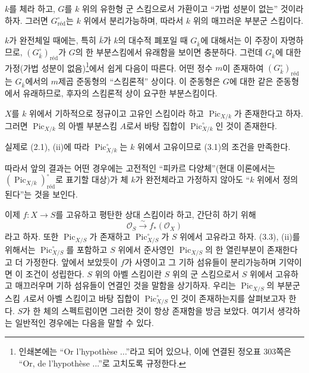 
 $k$를 체라 하고, $G$를 $k$ 위의 유한형 군 스킴으로서
가환이고 ``가법 성분이 없는'' 것이라 하자. 그러면
$G_{\mathrm{réd}}^\circ$는 $k$ 위에서 분리가능하며, 따라서 $k$ 위의
매끄러운 부분군 스킴이다.

$k$가 완전체일 때에는, 특히 $\bar k$가 $k$의 대수적 폐포일 때
$G_{\bar k}$에 대해서는 이 주장이 자명하므로,
$(G_{\bar k}^\circ)_{\mathrm{réd}}$가 $G$의 한 부분스킴에서 유래함을 보이면
충분하다. 그런데 $G_{\bar k}$에 대한 가정(가법 성분이 없음)\footnote{인쇄본에는
``Or l'hypothèse ...''라고 되어 있으나, 이에 연결된 정오표 303쪽은
``Or, de l'hypothèse ...''로 고치도록 규정한다.}에서 쉽게 다음이 따른다.
어떤 정수 $m$이 존재하여 $(G_{\bar k}^\circ)_{\mathrm{réd}}$는
$G_{\bar k}$에서의 $m$제곱 준동형의 ``스킴론적'' 상이다. 이 준동형은
$G$에 대한 같은 준동형에서 유래하므로, 후자의 스킴론적 상이 요구한
부분스킴이다.

 $X$를 $k$ 위에서 기하적으로 정규이고 고유인 스킴이라 하고
$\operatorname{Pic}_{X/k}$가 존재한다고 하자. 그러면
$\operatorname{Pic}_{X/k}$의 아벨 부분스킴 $A$로서 바탕 집합이
$\operatorname{Pic}_{X/k}^\circ$인 것이 존재한다.

실제로 (2.1), (ii)에 따라 $\operatorname{Pic}_{X/k}^\circ$는 $k$ 위에서
고유이므로 (3.1)의 조건을 만족한다.

따라서 앞의 결과는 어떤 경우에는 고전적인 ``피카르 다양체''(현대 이론에서는
$(\operatorname{Pic}_{X/k})_{\mathrm{réd}}^\circ$로 표기할 대상)가
체 $k$가 완전체라고 가정하지 않아도 ``$k$ 위에서 정의된다''는 것을 보인다.

이제 $f:X\longrightarrow S$를 고유하고 평탄한 상대 스킴이라 하고, 간단히
하기 위해
\[
\mathcal O_S\xrightarrow{\sim}f_*(\mathcal O_X)
\]
라고 하자. 또한 $\operatorname{Pic}_{X/S}$가 존재하고
$\operatorname{Pic}_{X/S}^\circ$가 $S$ 위에서 고유라고 하자. (3.3), (ii)를
위해서는 $\operatorname{Pic}_{X/S}^\circ$를 포함하고 $S$ 위에서
준사영인 $\operatorname{Pic}_{X/S}$의 한 열린부분이 존재한다고 더
가정한다. 앞에서 보았듯이 $f$가 사영이고 그 기하 섬유들이 분리가능하며
기약이면 이 조건이 성립한다. $S$ 위의 아벨 스킴이란 $S$ 위의 군
스킴으로서 $S$ 위에서 고유하고 매끄러우며 기하 섬유들이 연결인 것을
말함을 상기하자. 우리는 $\operatorname{Pic}_{X/S}$의 부분군 스킴 $A$로서
아벨 스킴이고 바탕 집합이 $\operatorname{Pic}_{X/S}^\circ$인 것이
존재하는지를 살펴보고자 한다. $S$가 한 체의 스펙트럼이면 그러한 것이
항상 존재함을 방금 보았다. 여기서 생각하는 일반적인 경우에는 다음을
말할 수 있다.

